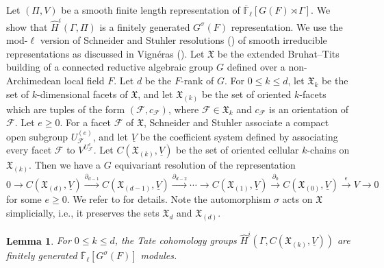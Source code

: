 \documentclass[10pt, reqno]{amsart}
\theoremstyle{plain}
\numberwithin{equation}{section} \newcommand{\di}{\operatorname{dim}}
\newtheorem{lemma}[theorem]{Lemma}
\begin{document}
\subsection{}
Let $(\Pi,V)$ be a smooth finite length representation of
$\overline{\mathbb{F}}_\ell[G(F)\rtimes\Gamma]$.  We show that $\widehat{H}^i(\Gamma, \Pi)$ is a finitely generated
$G^\sigma(F)$ representation. We use the mod-$\ell$ version of
Schneider and Stuhler resolutions (\cite[Theorem
II.3.1]{Schneider_Stuhler}) of smooth irreducible representations
as discussed in Vign\'eras (\cite[Proposition 2.6]{vigneras_reso}). Let
$\mathfrak{X}$ be the extended Bruhat--Tits building of a connected
reductive algebraic group $G$ defined over a non-Archimedean local field $F$.
Let $d$ be the $F$-rank of $G$. 
For $0\leq k\leq d$, let $\mathfrak{X}_{k}$ be the set of $k$-dimensional 
facets of $\mathfrak{X}$, and
let $\mathfrak{X}_{(k)}$ be the set of oriented $k$-facets which are
tuples of the form $(\mathcal{F}, c_\mathcal{F})$, where
$\mathcal{F}\in \mathfrak{X}_k$ and $c_\mathcal{F}$ is an orientation
of $\mathcal{F}$. Let $e\geq 0$. For a facet $\mathcal{F}$ of
$\mathfrak{X}$, Schneider and Stuhler associate a compact open
subgroup $U_\mathcal{F}^{(e)}$, and let $\underline{V}$ be the
coefficient system defined by associating every facet $\mathcal{F}$ to
$V^{U^e_\mathcal{F}}$. Let $C(\mathfrak{X}_{(k)}, \underline{V})$ be
the set of oriented cellular $k$-chains on $\mathfrak{X}_{(k)}$. Then 
we have a $G$ equivariant resolution of the representation
\begin{equation}\label{ss_resolu}
0\rightarrow C(\mathfrak{X}_{(d)}, \underline{V})
\xrightarrow{\partial_{d-1}} C(\mathfrak{X}_{(d-1)},
\underline{V})\xrightarrow{\partial_{d-2}} \cdots \rightarrow
C(\mathfrak{X}_{(1)}, \underline{V})\xrightarrow{\partial_0}
C(\mathfrak{X}_{(0)}, \underline{V})\xrightarrow{\epsilon}
V\rightarrow 0
\end{equation}
for some $e\geq 0$. We refer to \cite[Section II.2]{Schneider_Stuhler}
for details. 
Note the automorphism $\sigma$ acts on $\mathfrak{X}$ simplicially,
i.e., it preserves the sets $\mathfrak{X}_{d}$ and $\mathfrak{X}_{(d)}$.
\begin{lemma}\label{finite_gen_1}
For $0\leq k\leq d$,
the Tate cohomology groups $\widehat{H}^i(\Gamma, C(\mathfrak{X}_{(k)},
\underline{V}))$ are finitely generated
$\overline{\mathbb{F}}_\ell[G^\sigma(F)]$ modules. 
\end{lemma}
\end{document}
